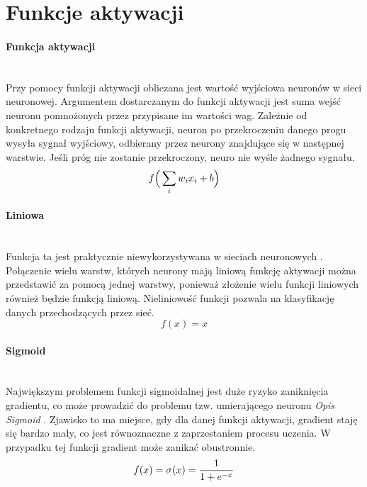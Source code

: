 \section{Funkcje aktywacji}
\paragraph{Funkcja aktywacji} \mbox{}\\
Przy pomocy funkcji aktywacji obliczana jest wartość wyjściowa neuronów w sieci
neuronowej. Argumentem dostarczanym do funkcji aktywacji jest suma wejść neuronu
pomnożonych przez przypisane im wartości wag. Zależnie od konkretnego rodzaju funkcji
aktywacji, neuron po przekroczeniu danego progu wysyła sygnał wyjściowy, odbierany
przez neurony znajdujące się w następnej warstwie. Jeśli próg nie zostanie przekroczony,
neuro nie wyśle żadnego sygnału.
\begin{equation}
f\Big(\sum_{i}w_{i}x_{i} + b\Big) \\
\end{equation}

\paragraph{Liniowa} \mbox{}\\
Funkcja ta jest praktycznie niewykorzystywana w sieciach neuronowych \cite{activationFunctions}.
Połączenie wielu warstw, których neurony mają liniową funkcję aktywacji można przedstawić
za pomocą jednej warstwy, ponieważ złożenie wielu funkcji liniowych również będzie
funkcją liniową. Nieliniowość funkcji pozwala na klasyfikację danych przechodzących
przez sieć.
\begin{equation}
f(x) = x
\end{equation}

\paragraph{Sigmoid} \mbox{}\\
Największym problemem funkcji sigmoidalnej jest duże ryzyko zaniknięcia gradientu,
co może prowadzić do problemu tzw. umierającego neuronu \textit{Opis Sigmoid} \cite{activationFunctions}.
Zjawisko to ma miejsce, gdy dla danej funkcji aktywacji, gradient staję się bardzo mały, co jest równoznaczne
z zaprzestaniem procesu uczenia. W przypadku tej funkcji gradient może zanikać obustronnie.
\begin{equation}
f(x) = \sigma(x) = \frac{1}{1 + e^{-x}} \\
\end{equation}

